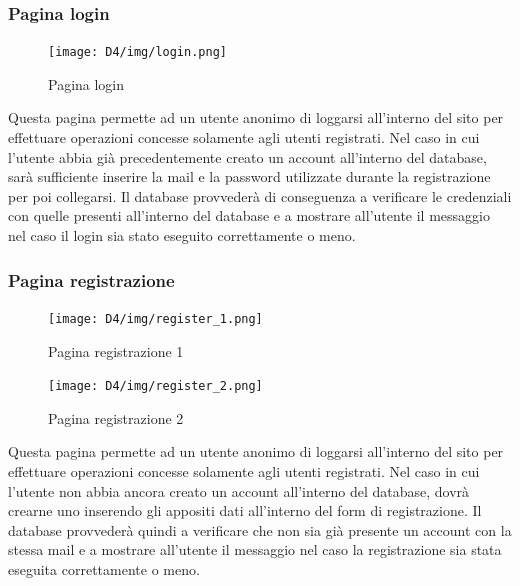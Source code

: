 \documentclass[a4paper,12pt]{article}
\begin{document}
\subsubsection{Pagina login}
\begin{figure}[H]
    \centering
    \texttt{[image: D4/img/login.png]}
    \caption{Pagina login}
\end{figure}
Questa pagina permette ad un utente anonimo di loggarsi all'interno del sito per effettuare operazioni concesse solamente agli utenti registrati. \newline
Nel caso in cui l'utente abbia già precedentemente creato un account all'interno del database, sarà sufficiente inserire la mail e la password utilizzate durante la registrazione per poi collegarsi. \newline
Il database provvederà di conseguenza a verificare le credenziali con quelle presenti all'interno del database e a mostrare all'utente il messaggio nel caso il login sia stato eseguito correttamente o meno.

\subsubsection{Pagina registrazione}
\begin{figure}[H]
    \centering
    \texttt{[image: D4/img/register\_1.png]}
    \caption{Pagina registrazione 1}
\end{figure}
\begin{figure}[H]
    \centering
    \texttt{[image: D4/img/register\_2.png]}
    \caption{Pagina registrazione 2}
\end{figure}
Questa pagina permette ad un utente anonimo di loggarsi all'interno del sito per effettuare operazioni concesse solamente agli utenti registrati. \newline
Nel caso in cui l'utente non abbia ancora creato un account all'interno del database, dovrà crearne uno inserendo gli appositi dati all'interno del form di registrazione. \newline
Il database provvederà quindi a verificare che non sia già presente un account con la stessa mail e a mostrare all'utente il messaggio nel caso la registrazione sia stata eseguita correttamente o meno.
\end{document}
